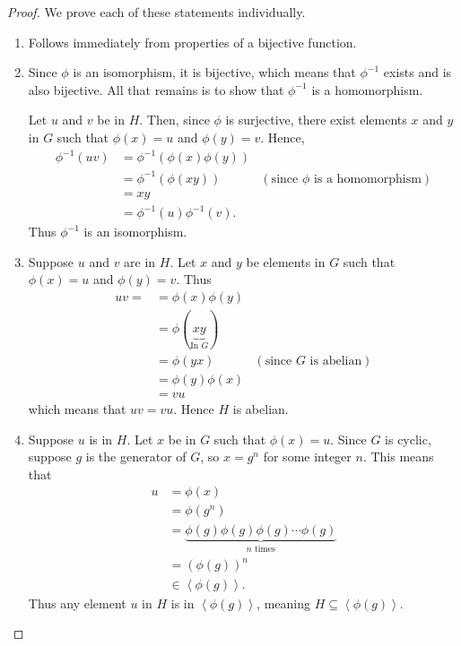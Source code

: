 \newpage

\begin{proof}
    We prove each of these statements individually.
    \begin{enumerate}
        \item Follows immediately from properties of a bijective function.

        \item Since $\phi$ is an isomorphism, it is bijective, which means that $\phi^{-1}$ exists and is also bijective. All that remains is to show that $\phi^{-1}$ is a homomorphism.

        Let $u$ and $v$ be in $H$. Then, since $\phi$ is surjective, there exist elements $x$ and $y$ in $G$ such that $\phi(x) = u$ and $\phi(y) = v$. Hence,
        \begin{align*}
            \phi^{-1}(uv) &= \phi^{-1}\left(\phi(x)\phi(y)\right)\\
            &= \phi^{-1}\left(\phi(xy)\right) & (\text{since } \phi \text{ is a homomorphism})\\
            &= xy\\
            &= \phi^{-1}(u) \phi^{-1}(v).
        \end{align*}
        Thus $\phi^{-1}$ is an isomorphism.

        \item Suppose $u$ and $v$ are in $H$. Let $x$ and $y$ be elements in $G$ such that $\phi(x) = u$ and $\phi(y) = v$. Thus
        \begin{align*}
            uv = &= \phi(x)\phi(y) \\
            &= \phi(\underbrace{xy}_{\text{In } G})\\
            &= \phi(yx) & (\text{since } G \text{ is abelian})\\
            &= \phi(y)\phi(x)\\
            &= vu
        \end{align*}
        which means that $uv = vu$. Hence $H$ is abelian.

        \item Suppose $u$ is in $H$. Let $x$ be in $G$ such that $\phi(x) = u$. Since $G$ is cyclic, suppose $g$ is the generator of $G$, so $x = g^n$ for some integer $n$. This means that
        \begin{align*}
            u &= \phi(x)\\
            &= \phi(g^n)\\
            &= \underbrace{\phi(g)\phi(g)\phi(g)\cdots\phi(g)}_{n \text{ times}}\\
            &= \left(\phi(g)\right)^n\\
            &\in \left\langle \phi(g) \right\rangle.
        \end{align*}
        Thus any element $u$ in $H$ is in $\left\langle \phi(g) \right\rangle$, meaning $H \subseteq \left\langle \phi(g) \right\rangle$.


\end{enumerate}
\end{proof}
